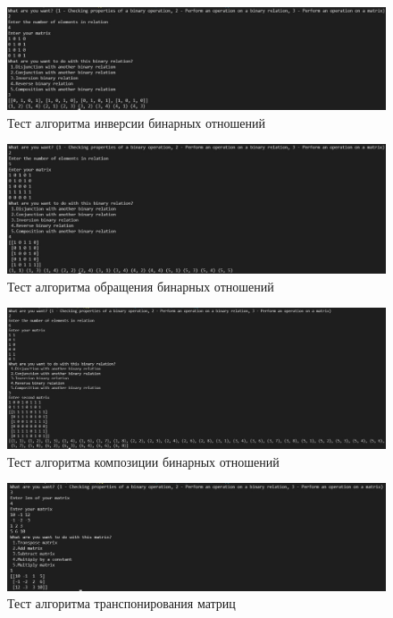 \documentclass[spec, och, labwork]{shiza}
\begin{document}
\begin{figure}[H]
    \centering      %
    \includegraphics[width=1.\textwidth]{4}
    \caption{Тест алгоритма инверсии бинарных отношений}
    \label{fig:image1}
\end{figure}

\begin{figure}[H]
    \centering      %
    \includegraphics[width=1.\textwidth]{5}
    \caption{Тест алгоритма обращения бинарных отношений}
    \label{fig:image1}
\end{figure}

\begin{figure}[H]
    \centering      %
    \includegraphics[width=1.\textwidth]{6}
    \caption{Тест алгоритма композиции бинарных отношений}
    \label{fig:image1}
\end{figure}

\begin{figure}[H]
    \centering      %
    \includegraphics[width=1.\textwidth]{7}
    \caption{Тест алгоритма транспонирования матриц}
    \label{fig:image1}
\end{figure}
\end{document}
